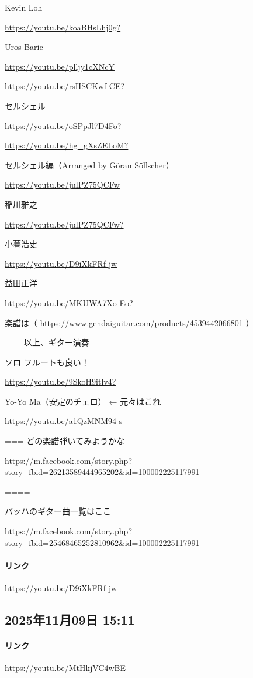 Kevin Loh

\url{https://youtu.be/koaBHsLhj0g?}

Uros Baric

\url{https://youtu.be/plljy1cXNcY}

\url{https://youtu.be/rsHSCKwf-CE?}

セルシェル

\url{https://youtu.be/oSPpJl7D4Fo?}

\url{https://youtu.be/hg_gXsZELoM?}

セルシェル編（Arranged by Göran Söllscher）

\url{https://youtu.be/julPZ75QCFw}

稲川雅之

\url{https://youtu.be/julPZ75QCFw?}

小暮浩史

\url{https://youtu.be/D9iXkFRf-jw}

益田正洋

\url{https://youtu.be/MKUWA7Xo-Eo?}

楽譜は（ \url{https://www.gendaiguitar.com/products/4539442066801} ）

===以上、ギター演奏

ソロ フルートも良い！

\url{https://youtu.be/9SkoH9itlv4?}

Yo-Yo Ma（安定のチェロ） ← 元々はこれ

\url{https://youtu.be/a1QzMNM94-s}

=== どの楽譜弾いてみようかな

\url{https://m.facebook.com/story.php?story_fbid=26213589444965202&id=100002225117991}

====

バッハのギター曲一覧はここ

\url{https://m.facebook.com/story.php?story_fbid=25468465252810962&id=100002225117991}

\paragraph{リンク}
\url{https://youtu.be/D9iXkFRf-jw}

\subsection*{2025年11月09日 15:11}

\paragraph{リンク}
\url{https://youtu.be/MtHkjVC4wBE}

